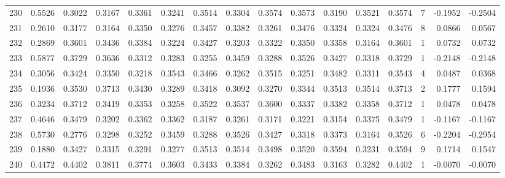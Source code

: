 \begin{tabular}{lrrrrrrrrrrrrrrr}
230 &      0.5526 &  0.3022 &  0.3167 &  0.3361 &  0.3241 &  0.3514 &  0.3304 &  0.3574 &  0.3573 &  0.3190 &   0.3521 &     0.3574 &      7 &                   -0.1952 &                    -0.2504 \\
231 &      0.2610 &  0.3177 &  0.3164 &  0.3350 &  0.3276 &  0.3457 &  0.3382 &  0.3261 &  0.3476 &  0.3324 &   0.3324 &     0.3476 &      8 &                    0.0866 &                     0.0567 \\
232 &      0.2869 &  0.3601 &  0.3436 &  0.3384 &  0.3224 &  0.3427 &  0.3203 &  0.3322 &  0.3350 &  0.3358 &   0.3164 &     0.3601 &      1 &                    0.0732 &                     0.0732 \\
233 &      0.5877 &  0.3729 &  0.3636 &  0.3312 &  0.3283 &  0.3255 &  0.3459 &  0.3288 &  0.3526 &  0.3427 &   0.3318 &     0.3729 &      1 &                   -0.2148 &                    -0.2148 \\
234 &      0.3056 &  0.3424 &  0.3350 &  0.3218 &  0.3543 &  0.3466 &  0.3262 &  0.3515 &  0.3251 &  0.3482 &   0.3311 &     0.3543 &      4 &                    0.0487 &                     0.0368 \\
235 &      0.1936 &  0.3530 &  0.3713 &  0.3430 &  0.3289 &  0.3418 &  0.3092 &  0.3270 &  0.3344 &  0.3513 &   0.3514 &     0.3713 &      2 &                    0.1777 &                     0.1594 \\
236 &      0.3234 &  0.3712 &  0.3419 &  0.3353 &  0.3258 &  0.3522 &  0.3537 &  0.3600 &  0.3337 &  0.3382 &   0.3358 &     0.3712 &      1 &                    0.0478 &                     0.0478 \\
237 &      0.4646 &  0.3479 &  0.3202 &  0.3362 &  0.3362 &  0.3187 &  0.3261 &  0.3171 &  0.3221 &  0.3154 &   0.3375 &     0.3479 &      1 &                   -0.1167 &                    -0.1167 \\
238 &      0.5730 &  0.2776 &  0.3298 &  0.3252 &  0.3459 &  0.3288 &  0.3526 &  0.3427 &  0.3318 &  0.3373 &   0.3164 &     0.3526 &      6 &                   -0.2204 &                    -0.2954 \\
239 &      0.1880 &  0.3427 &  0.3315 &  0.3291 &  0.3277 &  0.3513 &  0.3514 &  0.3498 &  0.3520 &  0.3594 &   0.3231 &     0.3594 &      9 &                    0.1714 &                     0.1547 \\
240 &      0.4472 &  0.4402 &  0.3811 &  0.3774 &  0.3603 &  0.3433 &  0.3384 &  0.3262 &  0.3483 &  0.3163 &   0.3282 &     0.4402 &      1 &                   -0.0070 &                    -0.0070 \\

\end{tabular}
